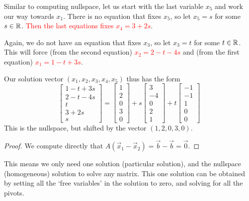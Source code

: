 Similar to computing nullspace, let us start with the last variable $x_5$ and work our way towards $x_1$.
There is no equation that fixes $x_5$, so let $x_5 = s$ for some $s\in\mathbb{R}$.
\textcolor{red}{Then the last equations fixes $x_4 = 3+2s$}. 

Again, we do not have an equation that fixes $x_3$, so let $x_3=t$ for some $t\in\mathbb{R}$.
This will force (from the second equation) \textcolor{red}{$x_2= 2-t-4s$} and (from the first equation) \textcolor{red}{$x_1 = 1-t+3s$}.

Our solution vector $(x_1,x_2,x_3,x_4,x_5)$ thus has the form \[
\begin{bmatrix}
	1-t+3s\\ 2-t-4s\\ t\\ 3+2s\\ s
\end{bmatrix}= \begin{bmatrix}
	1\\2\\0\\3\\0
\end{bmatrix}+s\begin{bmatrix}
	3 \\ -4 \\ 0 \\ 2 \\ 1
\end{bmatrix} + t \begin{bmatrix}
	-1 \\ -1 \\ 1 \\0 \\0
\end{bmatrix}
\]
This is the nullspace, but shifted by the vector $(1,2,0,3,0)$.
\begin{proof}
	We compute directly that $A(\vec{x}_1-\vec{x}_2)=\vec{b}-\vec{b}=\vec{0}$.
\end{proof}
This means we only need one solution (particular solution), and the nullspace (homogeneous) solution to solve any matrix.
This one solution can be obtained by setting all the `free variables' in the solution to zero, and solving for all the pivots.

